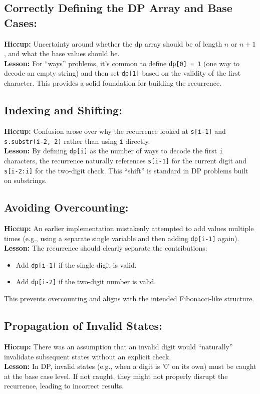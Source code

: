\documentclass[12pt]{article}
\begin{document}
\subsection*{Correctly Defining the DP Array and Base Cases:}
\textbf{Hiccup:} Uncertainty around whether the dp array should be of length $n$ or $n+1$, and what the base values should be.\\
\textbf{Lesson:} For ``ways'' problems, it's common to define \texttt{dp[0] = 1} (one way to decode an empty string) and then set \texttt{dp[1]} based on the validity of the first character. This provides a solid foundation for building the recurrence.

\subsection*{Indexing and Shifting:}
\textbf{Hiccup:} Confusion arose over why the recurrence looked at \texttt{s[i-1]} and \texttt{s.substr(i-2, 2)} rather than using \texttt{i} directly.\\
\textbf{Lesson:} By defining \texttt{dp[i]} as the number of ways to decode the first \texttt{i} characters, the recurrence naturally references \texttt{s[i-1]} for the current digit and \texttt{s[i-2:i]} for the two-digit check. This ``shift'' is standard in DP problems built on substrings.

\subsection*{Avoiding Overcounting:}
\textbf{Hiccup:} An earlier implementation mistakenly attempted to add values multiple times (e.g., using a separate single variable and then adding \texttt{dp[i-1]} again).\\
\textbf{Lesson:} The recurrence should clearly separate the contributions:
\begin{itemize}[leftmargin=*, label={--}]
    \item Add \texttt{dp[i-1]} if the single digit is valid.
    \item Add \texttt{dp[i-2]} if the two-digit number is valid.
\end{itemize}
This prevents overcounting and aligns with the intended Fibonacci-like structure.

\subsection*{Propagation of Invalid States:}
\textbf{Hiccup:} There was an assumption that an invalid digit would ``naturally'' invalidate subsequent states without an explicit check.\\
\textbf{Lesson:} In DP, invalid states (e.g., when a digit is '0' on its own) must be caught at the base case level. If not caught, they might not properly disrupt the recurrence, leading to incorrect results.
\end{document}
